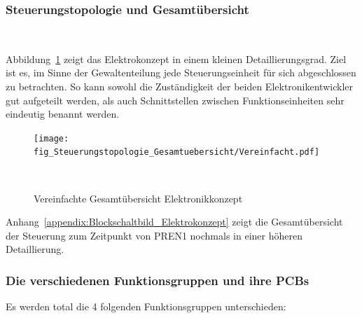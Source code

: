 \documentclass[main.tex]{subfiles} %
\begin{document}

\subsubsection{Steuerungstopologie und Gesamtübersicht}~\label{sec:Gesamtuebersicht_Elektro}

Abbildung~\ref{fig:Gesamtuebersicht_vereinfacht} zeigt das Elektrokonzept in
einem kleinen Detaillierungsgrad. Ziel ist es, im Sinne der Gewaltenteilung
jede Steuerungseinheit für sich abgeschlossen zu betrachten. So kann sowohl die
Zuständigkeit der beiden Elektronikentwickler gut aufgeteilt werden, als auch
Schnittstellen zwischen Funktionseinheiten sehr eindeutig benannt werden.

\begin{figure}[H]
      \centering
      \texttt{[image: fig\_Steuerungstopologie\_Gesamtuebersicht/Vereinfacht.pdf]}
      \caption{Vereinfachte Gesamtübersicht Elektronikkonzept}~\label{fig:Gesamtuebersicht_vereinfacht}
\end{figure}

Anhang~\ref{appendix:Blockschaltbild_Elektrokonzept} zeigt die Gesamtübersicht
der Steuerung zum Zeitpunkt von PREN1 nochmals in einer höheren Detaillierung.

\subsubsection*{Die verschiedenen Funktionsgruppen und ihre PCBs}
Es werden total die 4 folgenden Funktionsgruppen unterschieden:
\end{document}
